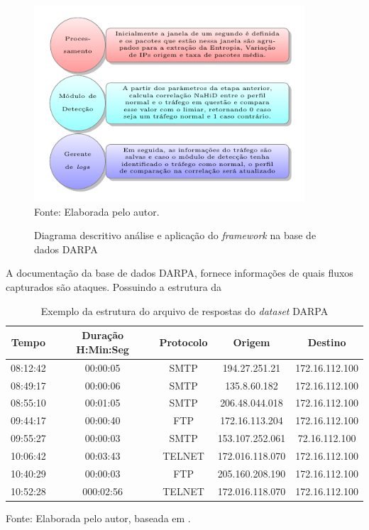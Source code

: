 \begin{figure}[!ht]
 	\centering
 	\caption{Diagrama descritivo análise e aplicação do \textit{framework} na base de dados DARPA  }
 	\includegraphics[width=0.9\textwidth]{figs/analiseDarpa.pdf}\\
 	{Fonte: Elaborada pelo autor.}
 	\label{fig:analiseDarpa}
\end{figure}

A documentação da base de dados DARPA, fornece informações de quais fluxos capturados são ataques. Possuindo a estrutura da  
 \begin{table}[!htb]
 	\centering
 	\begin{threeparttable}
 		\caption{Exemplo da estrutura do  arquivo de respostas do \textit{dataset} DARPA}
 		\label{Tab:RespostasDarpa}
 		\begin{tabular}{c c c c c }
 			\toprule
 			 \textbf{Tempo} &  \textbf{Duração H:Min:Seg} & \textbf{Protocolo} & \textbf{Origem} & \textbf{Destino}
 			\\ \midrule
 			  08:12:42 & 00:00:05 & SMTP& 194.27.251.21 & 172.16.112.100    \\ \midrule
			 08:49:17 & 00:00:06 & SMTP&  135.8.60.182 & 172.16.112.100    \\ \midrule
			 08:55:10 & 00:01:05 & SMTP&  206.48.044.018 & 172.16.112.100    \\ \midrule
			 09:44:17 & 00:00:40 & FTP&  172.16.113.204 & 172.16.112.100    \\ \midrule
			 09:55:27 & 00:00:03 & SMTP&  153.107.252.061 & 72.16.112.100    \\ \midrule
			 10:06:42 & 00:03:43 & TELNET&  172.016.118.070 & 172.16.112.100    \\ \midrule
			 10:40:29 & 00:00:03 & FTP&  205.160.208.190 & 172.16.112.100    \\ \midrule
 			 10:52:28 & 000:02:56 & TELNET& 172.016.118.070 & 172.16.112.100  \\ \bottomrule
 		\end{tabular}
 		{Fonte: Elaborada pelo autor, baseada em \cite{DARPA}.}
 	\end{threeparttable}
 \end{table}
 
